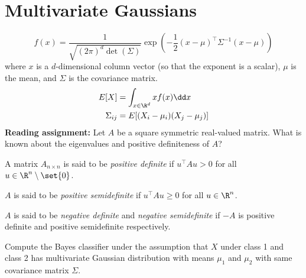 \section{Multivariate Gaussians} \label{sec:multivariate_gaussians}
\[
    f(x) = \frac{1}{\sqrt{(2\pi)^d \det(\Sigma)}}
    \exp\left(-\frac{1}{2} (x - \mu)^\top \Sigma^{-1} (x - \mu)\right)
\] where $x$ is a $d$-dimensional column vector (so that the exponent is a
scalar), $\mu$ is the mean, and $\Sigma$ is the covariance matrix.
\begin{align*}
    E[X] &= \int_{x \in \R^d} x f(x) \dd x \\
    \Sigma_{ij} &= E[(X_i - \mu_i)(X_j - \mu_j)]
\end{align*}
\textbf{Reading assignment:} Let $A$ be a square symmetric real-valued matrix.
What is known about the eigenvalues and positive definiteness of $A$?

\begin{definition} \label{def:definite}
    A matrix $A_{n \times n}$ is said to be \emph{positive definite}
    if $u^\top A u > 0$ for all $u \in \R^n \setminus \set{0}$.

    $A$ is said to be \emph{positive semidefinite} if $u^\top A u \ge 0$
    for all $u \in \R^n$.

    $A$ is said to be \emph{negative definite} and \emph{negative
    semidefinite} if $-A$ is positive definite and positive semidefinite
    respectively.
\end{definition}

\begin{exercise}
    Compute the Bayes classifier under the assumption that $X$ under class 1
    and class 2 has multivariate Gaussian distribution with means $\mu_1$
    and $\mu_2$ with same covariance matrix $\Sigma$.
\end{exercise}
